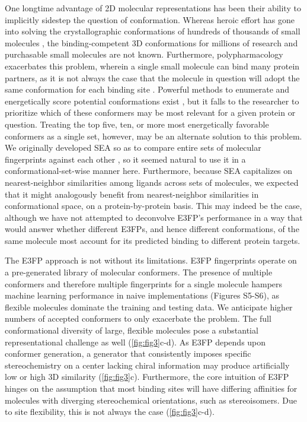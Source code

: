 \documentclass[../../main.tex]{subfiles}
\begin{document}
\begin{refsection}
	One longtime advantage of 2D molecular representations has been their ability to implicitly sidestep the question of conformation.
	Whereas heroic effort has gone into solving the crystallographic conformations of hundreds of thousands of small molecules \supercite{allen_2002,kellenberger_2006}, the binding-competent 3D conformations for millions of research  \supercite{bento_2014} and purchasable \supercite{sterling_2015} small molecules are not known.
	Furthermore, polypharmacology exacerbates this problem, wherein a single small molecule can bind many protein partners, as it is not always the case that the molecule in question will adopt the same conformation for each binding site \supercite{nicholls_2010}.
	Powerful methods to enumerate and energetically score potential conformations exist \supercite{halgren_1996,gonzlez_2011,rappe_1992}, but it falls to the researcher to prioritize which of these conformers may be most relevant for a given protein or question.
	Treating the top five, ten, or more most energetically favorable conformers as a single set, however, may be an alternate solution to this problem.
	We originally developed SEA so as to compare entire sets of molecular fingerprints against each other  \supercite{keiser_2007}, so it seemed natural to use it in a conformational-set-wise manner here.
	Furthermore, because SEA capitalizes on nearest-neighbor similarities among ligands across sets of molecules, we expected that it might analogously benefit from nearest-neighbor similarities in conformational space, on a protein-by-protein basis.
	This may indeed be the case, although we have not attempted to deconvolve E3FP's performance in a way that would answer whether different E3FPs, and hence different conformations, of the same molecule most account for its predicted binding to different protein targets.

	The E3FP approach is not without its limitations.
	E3FP fingerprints operate on a pre-generated library of molecular conformers.
	The presence of multiple conformers and therefore multiple fingerprints for a single molecule hampers machine learning performance in naive implementations  (Figures S5-S6), as flexible molecules dominate the training and testing data.
	We anticipate higher numbers of accepted conformers to only exacerbate the problem.
	The full conformational diversity of large, flexible molecules pose a substantial representational challenge as well  (\cref{fig:fig3}c-d).
	As E3FP depends upon conformer generation, a generator that consistently imposes specific stereochemistry on a center lacking chiral information may produce artificially low or high 3D similarity  (\cref{fig:fig3}c).
	Furthermore, the core intuition of E3FP hinges on the assumption that most binding sites will have differing affinities for molecules with diverging stereochemical orientations, such as stereoisomers.
	Due to site flexibility, this is not always the case  (\cref{fig:fig3}c-d).


\end{refsection}
\end{document}
